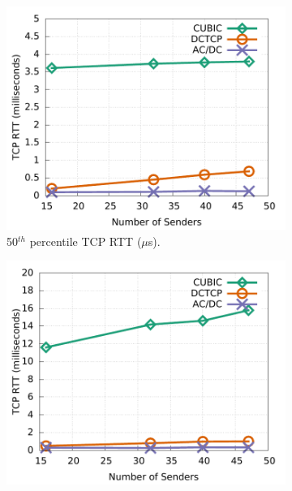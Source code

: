 \begin{figure}[t]
        \centering
        \begin{subfigure}[b]{0.33\textwidth}
                \centering
                \includegraphics[width=\textwidth]{figures/incast/plots9k/incast_sockperf50th_vary_sender.pdf}
                \caption{50$^{th}$ percentile TCP RTT ($\mu$s).}
                \label{incast_9k_50th_sockperf}
        \end{subfigure}
        \begin{subfigure}[b]{0.33\textwidth}
                \centering
                \includegraphics[width=\textwidth]{figures/incast/plots9k/incast_sockperf999th_vary_sender.pdf}

\end{subfigure}
\end{figure}
